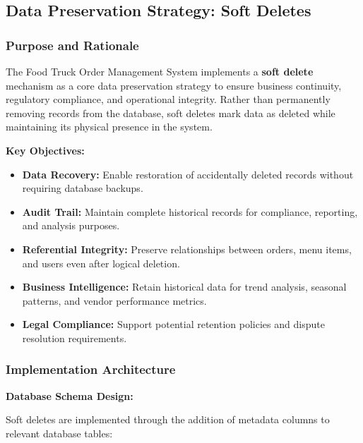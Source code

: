 \documentclass[12pt,a4paper]{article}
\begin{document}
\newpage

\subsection{Data Preservation Strategy: Soft Deletes}

\begin{tcolorbox}[colback=primaryblue!5, colframe=primaryblue, boxrule=1pt, arc=3pt, left=10pt, right=10pt, top=8pt, bottom=8pt]

\subsubsection{Purpose and Rationale}

The Food Truck Order Management System implements a \textbf{soft delete} mechanism as a core data preservation strategy to ensure business continuity, regulatory compliance, and operational integrity. Rather than permanently removing records from the database, soft deletes mark data as deleted while maintaining its physical presence in the system.

\vspace{0.5em}

\textbf{Key Objectives:}
\begin{itemize}[leftmargin=2em, itemsep=6pt]
    \item \textbf{Data Recovery:} Enable restoration of accidentally deleted records without requiring database backups.
    \item \textbf{Audit Trail:} Maintain complete historical records for compliance, reporting, and analysis purposes.
    \item \textbf{Referential Integrity:} Preserve relationships between orders, menu items, and users even after logical deletion.
    \item \textbf{Business Intelligence:} Retain historical data for trend analysis, seasonal patterns, and vendor performance metrics.
    \item \textbf{Legal Compliance:} Support potential retention policies and dispute resolution requirements.
\end{itemize}

\subsubsection{Implementation Architecture}

\textbf{Database Schema Design:}

Soft deletes are implemented through the addition of metadata columns to relevant database tables:


\end{tcolorbox}
\end{document}
